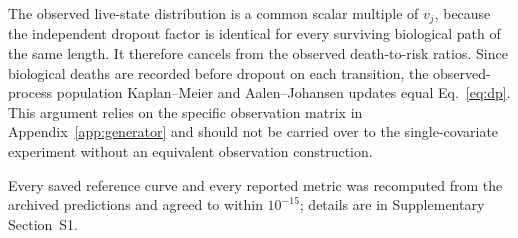 The observed live-state distribution is a common scalar multiple of $v_j$, because the independent dropout factor is identical for every surviving biological path of the same length. It therefore cancels from the observed death-to-risk ratios. Since biological deaths are recorded before dropout on each transition, the observed-process population Kaplan--Meier and Aalen--Johansen updates equal Eq.~\eqref{eq:dp}. This argument relies on the specific observation matrix in Appendix~\ref{app:generator} and should not be carried over to the single-covariate experiment without an equivalent observation construction.

Every saved reference curve and every reported metric was recomputed from the archived predictions and agreed to within $10^{-15}$; details are in Supplementary Section~S1.
